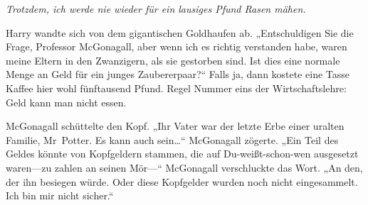 \emph{Trotzdem, ich werde nie wieder für ein lausiges Pfund Rasen mähen.}

Harry wandte sich von dem gigantischen Goldhaufen ab. „Entschuldigen Sie die Frage, Professor McGonagall, aber wenn ich es richtig verstanden habe, waren meine Eltern in den Zwanzigern, als sie gestorben sind. Ist dies eine normale Menge an Geld für ein junges Zaubererpaar?“ Falls ja, dann kostete eine Tasse Kaffee hier wohl fünftausend Pfund. Regel Nummer eins der Wirtschaftslehre: Geld kann man nicht essen.

McGonagall schüttelte den Kopf. „Ihr Vater war der letzte Erbe einer uralten Familie, Mr~Potter. Es kann auch sein…“ McGonagall zögerte. „Ein Teil des Geldes könnte von Kopfgeldern stammen, die auf Du-weißt-schon-wen ausgesetzt waren—zu zahlen an seinen Mör—“ McGonagall verschluckte das Wort. „An den, der ihn besiegen würde. Oder diese Kopfgelder wurden noch nicht eingesammelt. Ich bin mir nicht sicher.“

